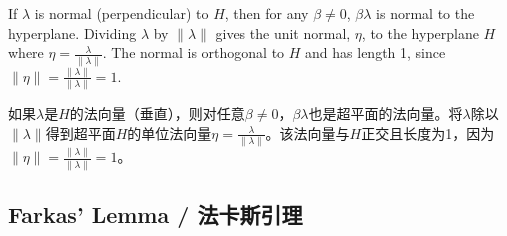 \begin{original}
If $\lambda$ is normal (perpendicular) to $H$, then for any $\beta \ne 0$, $\beta\lambda$ is normal to the hyperplane. Dividing $\lambda$ by $\|\lambda\|$ gives the unit normal, $\eta$, to the hyperplane $H$ where $\eta = \frac{\lambda}{\|\lambda\|}$. The normal is orthogonal to $H$ and has length 1, since $\|\eta\| = \frac{\|\lambda\|}{\|\lambda\|} = 1$.
\end{original}
\begin{translation}
如果$\lambda$是$H$的法向量（垂直），则对任意$\beta \ne 0$，$\beta\lambda$也是超平面的法向量。将$\lambda$除以$\|\lambda\|$得到超平面$H$的单位法向量$\eta = \frac{\lambda}{\|\lambda\|}$。该法向量与$H$正交且长度为1，因为$\|\eta\| = \frac{\|\lambda\|}{\|\lambda\|} = 1$。
\end{translation}

\subsection{Farkas' Lemma / 法卡斯引理}


